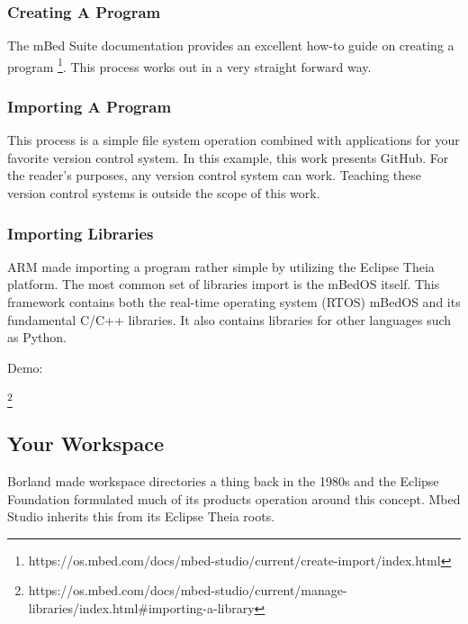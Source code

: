 \documentclass{article}
\begin{document}

\subsubsection{Creating A Program} %
\label{ssub:creating_a_program}
The mBed Suite documentation provides an excellent how-to guide on creating a program \footnote{https://os.mbed.com/docs/mbed-studio/current/create-import/index.html}.   This process works out in a very straight forward way.  




\subsubsection{Importing A Program} %
\label{ssub:importing_a_program}

This process is a simple file system operation combined with applications for your favorite version control system.  In this example, this work presents GitHub.  For the reader's purposes, any version control system can work.  Teaching these version control systems is outside the scope of this work.




\subsubsection{Importing Libraries} %
\label{ssub:importing_libraries}
ARM made importing a program rather simple by utilizing the Eclipse Theia platform.  The most common set of libraries import is the mBedOS itself.  This framework contains both the real-time operating system (RTOS) mBedOS and its fundamental C/C++ libraries.  It also contains libraries for other languages such as Python.

Demo:

\footnote{https://os.mbed.com/docs/mbed-studio/current/manage-libraries/index.html#importing-a-library}


\subsection{Your Workspace} %
\label{sub:your_workspace}

Borland made workspace directories a thing back in the 1980s and the Eclipse Foundation formulated much of its products operation around this concept.  Mbed Studio inherits this from its Eclipse Theia roots.
\end{document}
